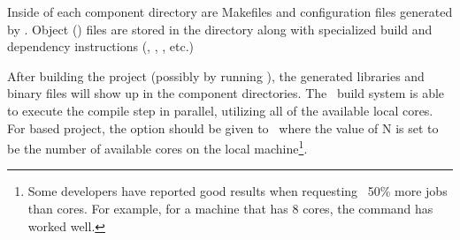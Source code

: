 Inside of each component directory are Makefiles and configuration files
generated by \cmake.  Object () files are stored in the  directory along with specialized build and dependency instructions (, , , etc.)

After building the project (possibly by running \make), the generated libraries and binary files will show up in the component directories.  The \draco\ build system is able to execute the compile step in parallel, utilizing all of the available local cores.  For  based project, the option  should be given to \make\ where the value of N is set to be the number of available cores on the local machine\footnote{Some developers have reported good results when requesting ~50\% more jobs than cores.  For example, for a machine that has 8 cores, the command  has worked well.}.  

